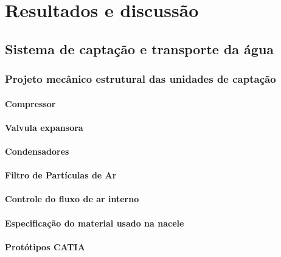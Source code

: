 \chapter[Resultados]{Resultados e discussão}
 
  \section{Sistema de captação e transporte da água}
    \subsection{Projeto mecânico estrutural das unidades de captação}
    	\subsubsection{Compressor}
   			
   		\subsubsection{Valvula expansora}
   			
   		\subsubsection{Condensadores}
   			
   		\subsubsection{Filtro de Partículas de Ar}
   			
   		\subsubsection{Controle do fluxo de ar interno}
   			
   		\subsubsection{Especificação do material usado na nacele}
   			
   		\subsubsection{Protótipos CATIA}
   			
    
    
